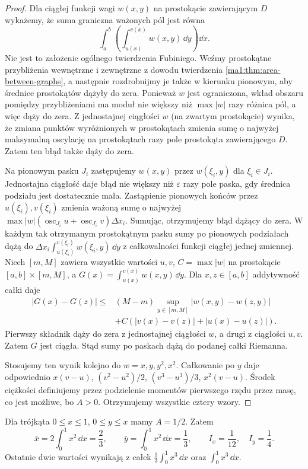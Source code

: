 \begin{proof}
Dla ciągłej funkcji wagi $w(x,y)$ na prostokącie zawierającym $D$ wykażemy, że suma graniczna ważonych pól jest równa
\[
 \int_a^b\left(\int_{u(x)}^{v(x)}w(x,y)\,\dd y\right)\dd x.
\]
Nie jest to założenie ogólnego twierdzenia Fubiniego. Weźmy prostokątne przybliżenia wewnętrzne i zewnętrzne z dowodu twierdzenia \ref{ma1:thm:area-between-graphs}, a następnie rozdrobnijmy je także w kierunku pionowym, aby średnice prostokątów dążyły do zera. Ponieważ $w$ jest ograniczona, wkład obszaru pomiędzy przybliżeniami ma moduł nie większy niż $\max|w|$ razy różnica pól, a więc dąży do zera. Z jednostajnej ciągłości $w$ (na zwartym prostokącie) wynika, że zmiana punktów wyróżnionych w prostokątach zmienia sumę o najwyżej maksymalną oscylację na prostokątach razy pole prostokąta zawierającego $D$. Zatem ten błąd także dąży do zera.

Na pionowym pasku $J_i$ zastępujemy $w(x,y)$ przez $w(\xi_i,y)$ dla $\xi_i\in J_i$. Jednostajna ciągłość daje błąd nie większy niż $\varepsilon$ razy pole paska, gdy średnica podziału jest dostatecznie mała. Zastąpienie pionowych końców przez $u(\xi_i),v(\xi_i)$ zmienia ważoną sumę o najwyżej $\max|w|(\operatorname{osc}_{J_i}u+\operatorname{osc}_{J_i}v)\Delta x_i$. Sumując, otrzymujemy błąd dążący do zera. W każdym tak otrzymanym prostokątnym pasku sumy po pionowych podziałach dążą do $\Delta x_i\int_{u(\xi_i)}^{v(\xi_i)}w(\xi_i,y)\,\dd y$ z całkowalności funkcji ciągłej jednej zmiennej. Niech $[m,M]$ zawiera wszystkie wartości $u,v$, $C=\max|w|$ na prostokącie $[a,b]\times[m,M]$, a $G(x)=\int_{u(x)}^{v(x)}w(x,y)\,\dd y$. Dla $x,z\in[a,b]$ addytywność całki daje
\[
 \begin{split}
 |G(x)-G(z)|\le{}&(M-m)\sup_{y\in[m,M]}|w(x,y)-w(z,y)|\\
 &+C(|v(x)-v(z)|+|u(x)-u(z)|).
 \end{split}
\]
Pierwszy składnik dąży do zera z jednostajnej ciągłości $w$, a drugi z ciągłości $u,v$. Zatem $G$ jest ciągła. Stąd sumy po paskach dążą do podanej całki Riemanna.

Stosujemy ten wynik kolejno do $w=x,y,y^2,x^2$. Całkowanie po $y$ daje odpowiednio $x(v-u)$, $(v^2-u^2)/2$, $(v^3-u^3)/3$, $x^2(v-u)$. Środek ciężkości definiujemy przez podzielenie momentów pierwszego rzędu przez masę, co jest możliwe, bo $A>0$. Otrzymujemy wszystkie cztery wzory.
\end{proof}
\begin{przyklad}
\label{ma1:ex:triangle-centroid}
Dla trójkąta $0\le x\le1$, $0\le y\le x$ mamy $A=1/2$. Zatem
\[
 \bar x=2\int_0^1 x^2\,\dd x=\frac23,\qquad
 \bar y=\int_0^1 x^2\,\dd x=\frac13,
 \qquad I_x=\frac1{12},\quad I_y=\frac14.
\]
Ostatnie dwie wartości wynikają z całek $\frac13\int_0^1 x^3\,\dd x$ oraz $\int_0^1 x^3\,\dd x$.
\end{przyklad}

